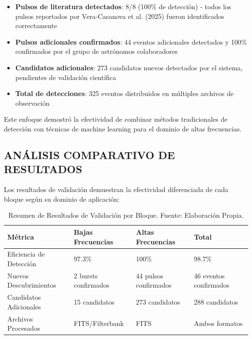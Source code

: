\begin{itemize}
    \item \textbf{Pulsos de literatura detectados}: 8/8 (100\% de detección) - todos los pulsos reportados por Vera-Casanova et al. (2025) fueron identificados correctamente
    \item \textbf{Pulsos adicionales confirmados}: 44 eventos adicionales detectados y 100\% confirmados por el grupo de astrónomos colaboradores
    \item \textbf{Candidatos adicionales}: 273 candidatos nuevos detectados por el sistema, pendientes de validación científica
    \item \textbf{Total de detecciones}: 325 eventos distribuidos en múltiples archivos de observación
\end{itemize}

Este enfoque demostró la efectividad de combinar métodos tradicionales de detección con técnicas de machine learning para el dominio de altas frecuencias.

\subsection{ANÁLISIS COMPARATIVO DE RESULTADOS}

Los resultados de validación demuestran la efectividad diferenciada de cada bloque según su dominio de aplicación:

\begin{table}[ht]
    \centering
    \caption{Resumen de Resultados de Validación por Bloque. Fuente: Elaboración Propia.}
    \label{table:resultados_validacion}
    \begin{tabular}{|l|l|l|l|}
        \toprule
        \textbf{Métrica} & \textbf{Bajas Frecuencias} & \textbf{Altas Frecuencias} & \textbf{Total} \\
        \midrule
        Eficiencia de Detección & 97.3\% & 100\% & 98.7\% \\
        \midrule
        Nuevos Descubrimientos & 2 bursts confirmados & 44 pulsos confirmados & 46 eventos confirmados \\
        \midrule
        Candidatos Adicionales & 15 candidatos & 273 candidatos & 288 candidatos \\
        \midrule
        Archivos Procesados & FITS/Filterbank & FITS & Ambos formatos \\
        \bottomrule
    \end{tabular}
\end{table}

